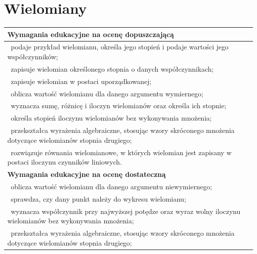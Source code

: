 \documentclass[12pt,a4paper]{article}
\begin{document}
	\section{Wielomiany}
	
	\begin{longtable}{|p{16cm}|}
		\hline
		
		\textbf{Wymagania edukacyjne na ocenę dopuszczającą} \\ \hline
		
		\textbullet\ podaje przykład wielomianu, określa jego stopień i podaje wartości jego współczynników; \\
		
		\textbullet\ zapisuje wielomian określonego stopnia o danych współczynnikach; \\
		
		\textbullet\ zapisuje wielomian w postaci uporządkowanej; \\
		
		\textbullet\ oblicza wartość wielomianu dla danego argumentu wymiernego; \\
		
		\textbullet\ wyznacza sumę, różnicę i iloczyn wielomianów oraz określa ich stopnie; \\
		
		\textbullet\ określa stopień iloczynu wielomianów bez wykonywania mnożenia; \\
		
		\textbullet\ przekształca wyrażenia algebraiczne, stosując wzory skróconego mnożenia dotyczące wielomianów stopnia drugiego; \\
		
		\textbullet\ rozwiązuje równania wielomianowe, w których wielomian jest zapisany w postaci iloczynu czynników liniowych. \\ \hline
		
		\textbf{Wymagania edukacyjne na ocenę dostateczną} \\ \hline
		
		\textbullet\ oblicza wartość wielomianu dla danego argumentu niewymiernego; \\
		
		\textbullet\ sprawdza, czy dany punkt należy do wykresu wielomianu; \\
		
		\textbullet\ wyznacza współczynnik przy najwyższej potędze oraz wyraz wolny iloczynu wielomianów bez wykonywania mnożenia; \\
		
		\textbullet\ przekształca wyrażenia algebraiczne, stosując wzory skróconego mnożenia dotyczące wielomianów stopnia drugiego; \\
		

\end{longtable}
\end{document}
